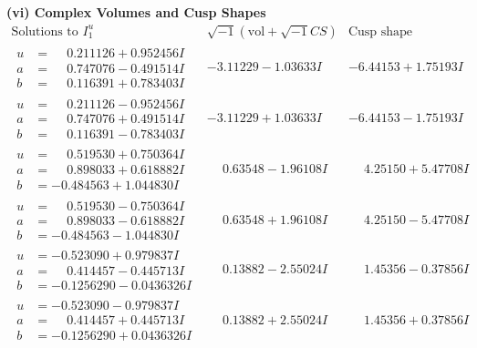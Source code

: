 \documentclass[1p]{elsarticle_modified}
\theoremstyle{definition}
\newcommand{\I}{\sqrt{-1}}
\begin{document}
\newpage\flushleft \textbf{(vi) Complex Volumes and Cusp Shapes}
$$\begin{array}{c|c|c}  
\text{Solutions to }I^u_{1}& \I (\text{vol} + \sqrt{-1}CS) & \text{Cusp shape}\\
 \hline 
\begin{aligned}
u &= \phantom{-}0.211126 + 0.952456 I \\
a &= \phantom{-}0.747076 - 0.491514 I \\
b &= \phantom{-}0.116391 + 0.783403 I\end{aligned}
 & -3.11229 - 1.03633 I & -6.44153 + 1.75193 I \\ \hline\begin{aligned}
u &= \phantom{-}0.211126 - 0.952456 I \\
a &= \phantom{-}0.747076 + 0.491514 I \\
b &= \phantom{-}0.116391 - 0.783403 I\end{aligned}
 & -3.11229 + 1.03633 I & -6.44153 - 1.75193 I \\ \hline\begin{aligned}
u &= \phantom{-}0.519530 + 0.750364 I \\
a &= \phantom{-}0.898033 + 0.618882 I \\
b &= -0.484563 + 1.044830 I\end{aligned}
 & \phantom{-}0.63548 - 1.96108 I & \phantom{-}4.25150 + 5.47708 I \\ \hline\begin{aligned}
u &= \phantom{-}0.519530 - 0.750364 I \\
a &= \phantom{-}0.898033 - 0.618882 I \\
b &= -0.484563 - 1.044830 I\end{aligned}
 & \phantom{-}0.63548 + 1.96108 I & \phantom{-}4.25150 - 5.47708 I \\ \hline\begin{aligned}
u &= -0.523090 + 0.979837 I \\
a &= \phantom{-}0.414457 - 0.445713 I \\
b &= -0.1256290 - 0.0436326 I\end{aligned}
 & \phantom{-}0.13882 - 2.55024 I & \phantom{-}1.45356 - 0.37856 I \\ \hline\begin{aligned}
u &= -0.523090 - 0.979837 I \\
a &= \phantom{-}0.414457 + 0.445713 I \\
b &= -0.1256290 + 0.0436326 I\end{aligned}
 & \phantom{-}0.13882 + 2.55024 I & \phantom{-}1.45356 + 0.37856 I \\ \hline\begin{aligned}

\end{aligned}
\end{array}$$
\end{document}
